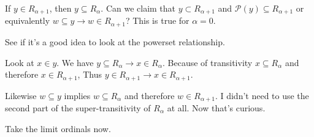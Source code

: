 \documentclass{article}
\begin{document}
If \(y \in R_{\alpha + 1}\), then \(y \subseteq R_\alpha\). Can we claim that
\(y \subset R_{\alpha + 1}\) and \(\mathcal{P}(y) \subseteq R_{\alpha + 1}\) or
equivalently \(w \subseteq y \rightarrow w \in R_{\alpha + 1}\)?
This is true for \(\alpha = 0\).

See if it's a good idea to look at the powerset relationship.

Look at \(x \in y\). We have \(y \subseteq R_\alpha \rightarrow x \in
R_\alpha\). Because of transitivity \(x \subseteq R_\alpha\) and therefore \(x
\in R_{\alpha + 1}\), Thus \(y \in R_{\alpha + 1} \rightarrow x \in R_{\alpha +
1}\).

Likewise \(w \subseteq y\) implies \(w \subseteq R_\alpha\) and therefore
\(w \in R_{\alpha + 1}\). I didn't need to use the second part of the
super-transitivity of \(R_\alpha\) at all. Now that's curious.

Take the limit ordinals now.
\end{document}
